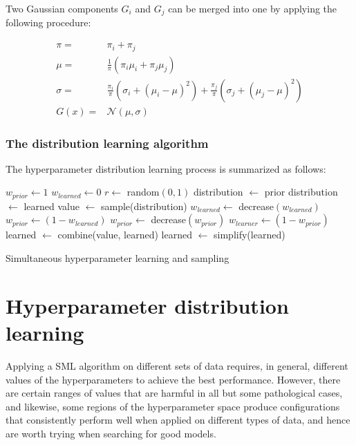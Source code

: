 	Two Gaussian components $G_i$ and $G_j$ can be merged into one by applying the following
	procedure:

	\begin{align}
		\pi = & \pi_i + \pi_j\\
		\mu = & \frac 1 \pi \left( \pi_i \mu_i + \pi_j \mu_j\right)\\
		\sigma = & \frac {\pi_i} {\pi} \left( \sigma_i + (\mu_i - \mu)^2 \right) + 
			      \frac {\pi_j} \pi \left( \sigma_j + (\mu_j - \mu)^2 \right) \\
				  G(x) = & \mathcal{N}(\mu, \sigma)
				  \label{eq:simplify_gaussians}
	\end{align}

	\subsection{The distribution learning algorithm}

	The hyperparameter distribution learning process is summarized as follows:

	\begin{algorithm}[here]
		\begin{algorithmic}[1]
			\State $w_{prior} \gets 1$
			\State $w_{learned} \gets 0$
			  
				\State $r \gets $ random$(0,1)$
					\State distribution $\gets$ prior
				\Else
					\State distribution $\gets$ learned
				\EndIf
				\State value $\gets$ sample(distribution)
				 
					\State $w_{learned} \gets$ decrease$(w_{learned})$
					\State $w_{prior} \gets (1 - w_{learned})$ 
				\Else
					\State $w_{prior} \gets$ decrease$(w_{prior})$
					\State $w_{learner} \gets (1 - w_{prior})$ 
				\EndIf
				\State learned $\gets$ combine(value, learned)  
				\State learned $\gets$ simplify(learned)  
			\EndWhile
			\EndProcedure
		\end{algorithmic}
		\label{algo:learn_hyperparameter}
		\caption{Simultaneous hyperparameter learning and sampling}
	\end{algorithm}

\chapter{Hyperparameter distribution learning}
	Applying a SML algorithm on different sets of data requires, in general, different values of the
	hyperparameters to achieve the best performance. However, there are certain ranges of values
	that are harmful in all but some pathological cases, and likewise, some regions of the
	hyperparameter space produce configurations that consistently perform well when applied on
	different types of data, and hence are worth trying when searching for good models.

